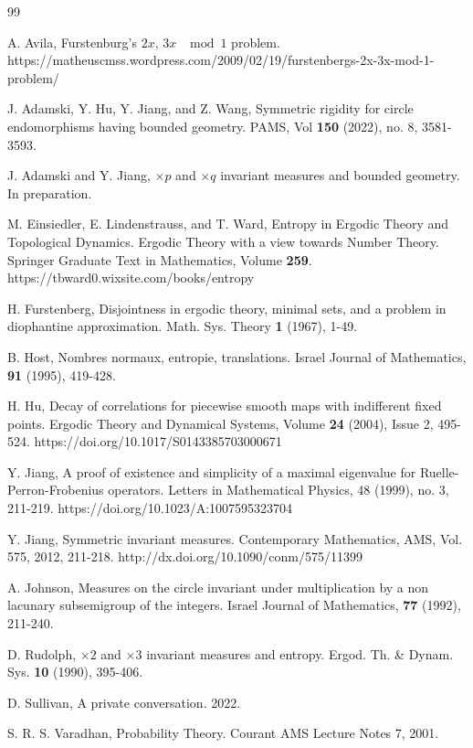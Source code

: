 \documentclass[11pt]{amsart}
\theoremstyle{definition}
\begin{document}
\begin{thebibliography}{99}
 
  A. Avila, Furstenburg's $2x$, $3x$ $\mod{1}$ problem. \\ https://matheuscmss.wordpress.com/2009/02/19/furstenbergs-2x-3x-mod-1-problem/
     
  J.  Adamski, Y. Hu, Y. Jiang, and Z. Wang,  Symmetric rigidity for circle endomorphisms having bounded geometry.  PAMS, Vol {\bf 150} (2022), no. 8, 3581-3593.
 
  J.  Adamski and Y. Jiang, $\times p$ and $\times q$ invariant measures and bounded geometry. In preparation.
 
  M. Einsiedler, E. Lindenstrauss, and T. Ward,  Entropy in Ergodic Theory and Topological Dynamics. 
 Ergodic Theory with a view towards Number Theory. Springer Graduate Text in Mathematics, Volume {\bf 259}.  \\ https://tbward0.wixsite.com/books/entropy  
 
 H. Furstenberg, Disjointness in ergodic theory, minimal sets, and a problem in diophantine approximation. 
 Math. Sys. Theory {\bf 1} (1967), 1-49.
 
 B. Host, Nombres normaux, entropie, translations. Israel Journal of Mathematics, {\bf 91} (1995), 419-428.
 
   H. Hu, Decay of correlations for piecewise smooth maps with indifferent fixed points. Ergodic Theory and Dynamical Systems, Volume {\bf 24} (2004), Issue 2, 495-524. https://doi.org/10.1017/S0143385703000671 
 
 Y. Jiang, A proof of existence and simplicity of a maximal eigenvalue for Ruelle-Perron-Frobenius operators. Letters in Mathematical Physics, 48 (1999), no. 3, 211-219. https://doi.org/10.1023/A:1007595323704 
 
  Y. Jiang, Symmetric invariant measures. Contemporary Mathematics, AMS, Vol. 575, 2012, 211-218. http://dx.doi.org/10.1090/conm/575/11399 
 
 
 A. Johnson, Measures on the circle invariant under multiplication by a non lacunary subsemigroup of the integers. Israel Journal of Mathematics, {\bf 77} (1992), 211-240.  
 
 D. Rudolph, $\times2$ and $\times3$ invariant measures and entropy. Ergod. Th. \& Dynam. Sys. {\bf 10} (1990), 395-406.

 D. Sullivan, A private conversation. 2022. 

 S. R. S. Varadhan, Probability Theory. Courant AMS Lecture Notes 7, 2001. 


 
 \end{thebibliography}
 



 
\end{document}

